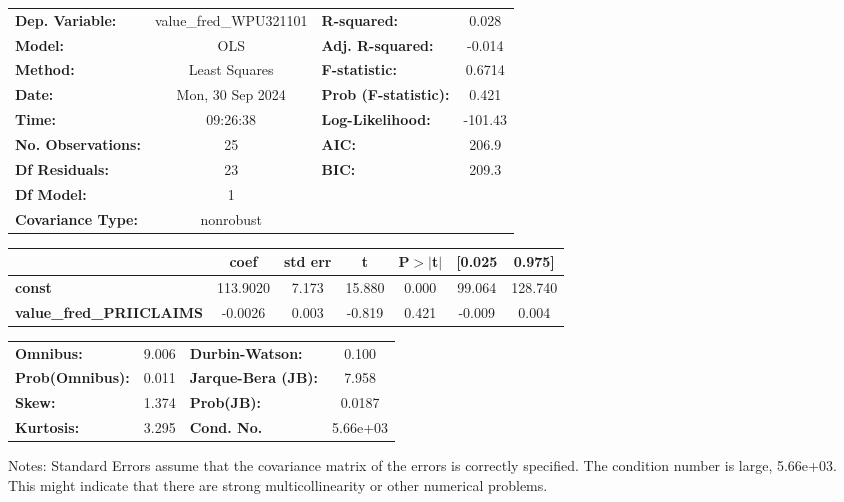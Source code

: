 \begin{center}
\begin{tabular}{lclc}
\toprule
\textbf{Dep. Variable:}          & value\_fred\_WPU321101 & \textbf{  R-squared:         } &     0.028   \\
\textbf{Model:}                  &          OLS           & \textbf{  Adj. R-squared:    } &    -0.014   \\
\textbf{Method:}                 &     Least Squares      & \textbf{  F-statistic:       } &    0.6714   \\
\textbf{Date:}                   &    Mon, 30 Sep 2024    & \textbf{  Prob (F-statistic):} &    0.421    \\
\textbf{Time:}                   &        09:26:38        & \textbf{  Log-Likelihood:    } &   -101.43   \\
\textbf{No. Observations:}       &             25         & \textbf{  AIC:               } &     206.9   \\
\textbf{Df Residuals:}           &             23         & \textbf{  BIC:               } &     209.3   \\
\textbf{Df Model:}               &              1         & \textbf{                     } &             \\
\textbf{Covariance Type:}        &       nonrobust        & \textbf{                     } &             \\
\bottomrule
\end{tabular}
\begin{tabular}{lcccccc}
                                 & \textbf{coef} & \textbf{std err} & \textbf{t} & \textbf{P$> |$t$|$} & \textbf{[0.025} & \textbf{0.975]}  \\
\midrule
\textbf{const}                   &     113.9020  &        7.173     &    15.880  &         0.000        &       99.064    &      128.740     \\
\textbf{value\_fred\_PRIICLAIMS} &      -0.0026  &        0.003     &    -0.819  &         0.421        &       -0.009    &        0.004     \\
\bottomrule
\end{tabular}
\begin{tabular}{lclc}
\textbf{Omnibus:}       &  9.006 & \textbf{  Durbin-Watson:     } &    0.100  \\
\textbf{Prob(Omnibus):} &  0.011 & \textbf{  Jarque-Bera (JB):  } &    7.958  \\
\textbf{Skew:}          &  1.374 & \textbf{  Prob(JB):          } &   0.0187  \\
\textbf{Kurtosis:}      &  3.295 & \textbf{  Cond. No.          } & 5.66e+03  \\
\bottomrule
\end{tabular}
\end{center}

Notes: \newline
 [1] Standard Errors assume that the covariance matrix of the errors is correctly specified. \newline
 [2] The condition number is large, 5.66e+03. This might indicate that there are \newline
 strong multicollinearity or other numerical problems.